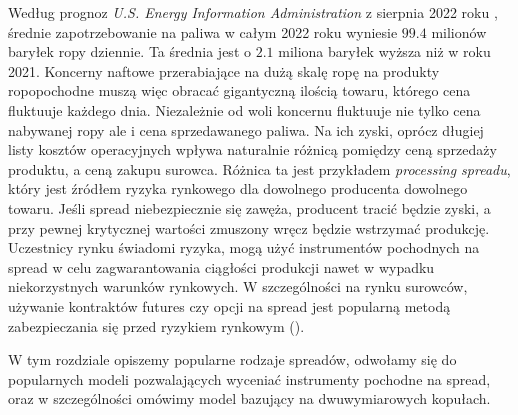 Według prognoz \emph{U.S. Energy Information Administration} z sierpnia 2022 roku \cite{PetroleumForecasts}, średnie zapotrzebowanie na paliwa w całym 2022 roku wyniesie $99.4$ milionów baryłek ropy dziennie. Ta średnia jest o $2.1$ miliona baryłek wyższa niż w roku 2021. Koncerny naftowe przerabiające na dużą skalę ropę na produkty ropopochodne muszą więc obracać gigantyczną ilością towaru, którego cena fluktuuje każdego dnia.
Niezależnie od woli koncernu fluktuuje nie tylko cena nabywanej ropy ale i cena sprzedawanego paliwa. Na ich zyski, oprócz długiej listy kosztów operacyjnych wpływa naturalnie różnicą pomiędzy ceną sprzedaży produktu, a ceną zakupu surowca. Różnica ta jest przykładem \emph{processing spreadu}, który jest źródłem ryzyka rynkowego dla dowolnego producenta dowolnego towaru. Jeśli spread niebezpiecznie się zawęża, producent tracić będzie zyski, a przy pewnej krytycznej wartości zmuszony wręcz będzie wstrzymać produkcję. Uczestnicy rynku świadomi ryzyka, mogą użyć instrumentów pochodnych na spread w celu zagwarantowania ciągłości produkcji nawet w wypadku niekorzystnych warunków rynkowych. W szczególności na rynku surowców, używanie kontraktów futures czy opcji na spread jest popularną metodą zabezpieczania się przed ryzykiem rynkowym (\cite{spread_hedging}).

W tym rozdziale opiszemy popularne rodzaje spreadów, odwołamy się do popularnych modeli pozwalających wyceniać instrumenty pochodne na spread, oraz w szczególności omówimy model bazujący na dwuwymiarowych kopułach.